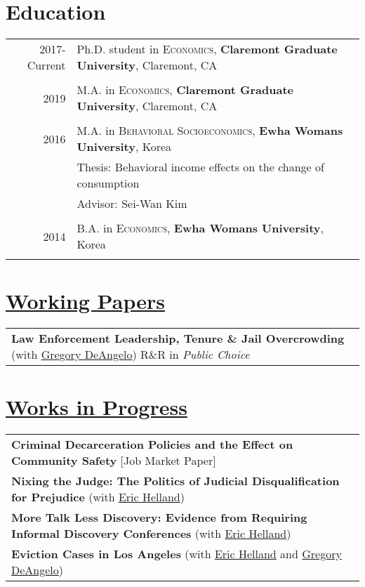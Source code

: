\documentclass[a4paper,10pt]{article}
\begin{document}
\section{Education}
\begin{tabular}{rl}	
2017-Current & Ph.D. student in \textsc{Economics}, \textbf{Claremont Graduate University}, Claremont, CA
\\&\\
2019& M.A. in \textsc{Economics}, \textbf{Claremont Graduate University}, Claremont, CA
\\&\\
2016& M.A. in \textsc{Behavioral Socioeconomics}, \textbf{Ewha Womans University}, Korea\\
& Thesis: Behavioral income effects on the change of consumption \\&\small Advisor: Sei-Wan Kim
\\&\\
2014& B.A. in \textsc{Economics}, \textbf{Ewha Womans University}, Korea
\\&\\
\end{tabular}

\section{\hyperlink{}{Working Papers}}
\begin{tabularx}{\textwidth}{p{}}
\textbf{Law Enforcement Leadership, Tenure \& Jail Overcrowding} (with \href{http://gregoryjdeangelo.com/}{Gregory DeAngelo}) R\&R in \textit{Public Choice}
\end{tabularx}

\section{\hyperlink{}{Works in Progress}}
\begin{tabularx}{\textwidth}{p{}}
\textbf{Criminal Decarceration Policies and the Effect on Community Safety} [Job Market Paper]  \\
\textbf{Nixing the Judge: The Politics of Judicial Disqualification for Prejudice} (with \href{https://www.cmc.edu/academic/faculty/profile/eric-helland}{Eric Helland}) \\
\textbf{More Talk Less Discovery: Evidence from Requiring Informal Discovery Conferences} (with \href{https://www.cmc.edu/academic/faculty/profile/eric-helland}{Eric Helland})
\\
\textbf{Eviction Cases in Los Angeles} (with \href{https://www.cmc.edu/academic/faculty/profile/eric-helland}{Eric Helland} and \href{http://gregoryjdeangelo.com/}{Gregory DeAngelo})
\end{tabularx}
\end{document}

